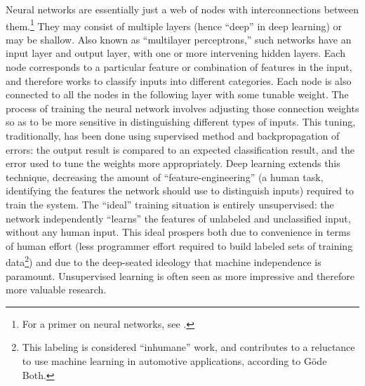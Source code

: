 
Neural networks are essentially just a web of nodes with
interconnections between them.\footnote{For a primer on neural
  networks, see \cite{neuralJordan}.} They may consist of multiple layers
(hence ``deep'' in deep learning) or may be shallow. Also known as
``multilayer perceptrons,'' such networks have an input layer and
output layer, with one or more intervening hidden layers. Each node
corresponds to a particular feature or combination of features in the
input, and therefore works to classify inputs into different
categories. Each node is also connected to all the nodes in the
following layer with some tunable weight. The process of training the
neural network involves adjusting those connection weights so as to
be more sensitive in distinguishing different types of
inputs. This tuning,
traditionally, has been done using supervised method and
backpropagation of errors: the output result is compared to an
expected classification result, and the error used to tune the weights
more appropriately. Deep learning extends this technique, decreasing
the amount of ``feature-engineering'' (a human task, identifying the
features the network should use to distinguish inputs) required to
train the system. The ``ideal'' training situation is entirely
unsupervised: the network independently ``learns'' the features of
unlabeled and unclassified input, without any human input. This ideal
prospers both due to convenience in terms of human effort (less
programmer effort required to build labeled sets of training
data\footnote{This labeling is considered ``inhumane'' work, and contributes to
a reluctance to use machine learning in automotive applications,
according to G\"{o}de Both.\cite{bothpt2}}) and
due to the deep-seated ideology that machine independence is
paramount. Unsupervised learning is often seen as more impressive and
therefore more valuable research.

